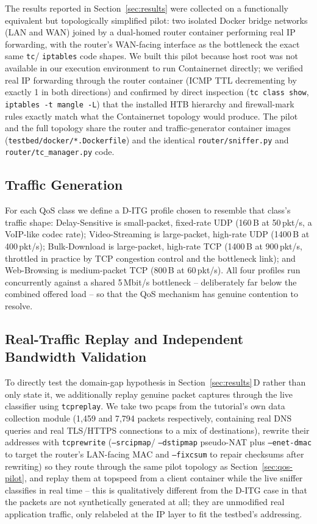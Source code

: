 \documentclass[10pt,twocolumn]{article}
\begin{document}
The results reported in Section~\ref{sec:results} were collected on a
functionally equivalent but topologically simplified pilot: two isolated
Docker bridge networks (LAN and WAN) joined by a dual-homed router
container performing real IP forwarding, with the router's
WAN-facing interface as the bottleneck the exact same \texttt{tc}/
\texttt{iptables} code shapes. We built this pilot because host root was
not available in our execution environment to run Containernet directly;
we verified real IP forwarding through the router container (ICMP TTL
decrementing by exactly 1 in both directions) and confirmed by direct
inspection (\texttt{tc class show}, \texttt{iptables -t mangle -L}) that
the installed HTB hierarchy and firewall-mark rules exactly match what
the Containernet topology would produce. The pilot and the full topology
share the router and traffic-generator container images
(\texttt{testbed/docker/*.Dockerfile}) and the identical
\texttt{router/sniffer.py} and \texttt{router/tc\_manager.py} code.

\subsection{Traffic Generation}

For each QoS class we define a D-ITG profile chosen to resemble that
class's traffic shape: Delay-Sensitive is small-packet, fixed-rate UDP
(160\,B at 50\,pkt/s, a VoIP-like codec rate); Video-Streaming is
large-packet, high-rate UDP (1400\,B at 400\,pkt/s); Bulk-Download is
large-packet, high-rate TCP (1400\,B at 900\,pkt/s, throttled in practice
by TCP congestion control and the bottleneck link); and Web-Browsing is
medium-packet TCP (800\,B at 60\,pkt/s). All four profiles run
concurrently against a shared 5\,Mbit/s bottleneck -- deliberately far
below the combined offered load -- so that the QoS mechanism has genuine
contention to resolve.

\subsection{Real-Traffic Replay and Independent Bandwidth Validation}
\label{sec:tcpreplay-method}

To directly test the domain-gap hypothesis in
Section~\ref{sec:results}\,D rather than only state it, we additionally
replay genuine packet captures through the live classifier using
\texttt{tcpreplay}. We take two pcaps from the tutorial's own data
collection module (1{,}459 and 7{,}794 packets respectively, containing
real DNS queries and real TLS/HTTPS connections to a mix of destinations),
rewrite their addresses with \texttt{tcprewrite} (\texttt{--srcipmap}/
\texttt{--dstipmap} pseudo-NAT plus \texttt{--enet-dmac} to target the
router's LAN-facing MAC and \texttt{--fixcsum} to repair checksums after
rewriting) so they route through the same pilot topology as
Section~\ref{sec:qos-pilot}, and replay them at topspeed from a client
container while the live sniffer classifies in real time -- this is
qualitatively different from the D-ITG case in that the packets are not
synthetically generated at all; they are unmodified real application
traffic, only relabeled at the IP layer to fit the testbed's addressing.
\end{document}
